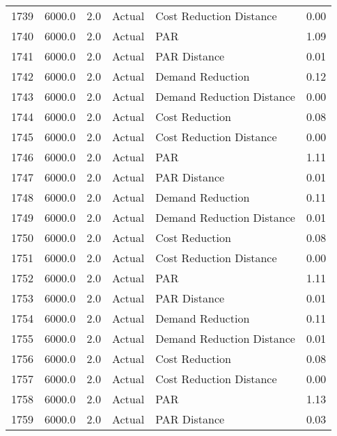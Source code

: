 \begin{longtable}{lrrllr}
1739 &       6000.0 &     2.0 &         Actual &    Cost Reduction Distance &   0.00 \\
1740 &       6000.0 &     2.0 &         Actual &                        PAR &   1.09 \\
1741 &       6000.0 &     2.0 &         Actual &               PAR Distance &   0.01 \\
1742 &       6000.0 &     2.0 &         Actual &           Demand Reduction &   0.12 \\
1743 &       6000.0 &     2.0 &         Actual &  Demand Reduction Distance &   0.00 \\
1744 &       6000.0 &     2.0 &         Actual &             Cost Reduction &   0.08 \\
1745 &       6000.0 &     2.0 &         Actual &    Cost Reduction Distance &   0.00 \\
1746 &       6000.0 &     2.0 &         Actual &                        PAR &   1.11 \\
1747 &       6000.0 &     2.0 &         Actual &               PAR Distance &   0.01 \\
1748 &       6000.0 &     2.0 &         Actual &           Demand Reduction &   0.11 \\
1749 &       6000.0 &     2.0 &         Actual &  Demand Reduction Distance &   0.01 \\
1750 &       6000.0 &     2.0 &         Actual &             Cost Reduction &   0.08 \\
1751 &       6000.0 &     2.0 &         Actual &    Cost Reduction Distance &   0.00 \\
1752 &       6000.0 &     2.0 &         Actual &                        PAR &   1.11 \\
1753 &       6000.0 &     2.0 &         Actual &               PAR Distance &   0.01 \\
1754 &       6000.0 &     2.0 &         Actual &           Demand Reduction &   0.11 \\
1755 &       6000.0 &     2.0 &         Actual &  Demand Reduction Distance &   0.01 \\
1756 &       6000.0 &     2.0 &         Actual &             Cost Reduction &   0.08 \\
1757 &       6000.0 &     2.0 &         Actual &    Cost Reduction Distance &   0.00 \\
1758 &       6000.0 &     2.0 &         Actual &                        PAR &   1.13 \\
1759 &       6000.0 &     2.0 &         Actual &               PAR Distance &   0.03 \\

\end{longtable}

